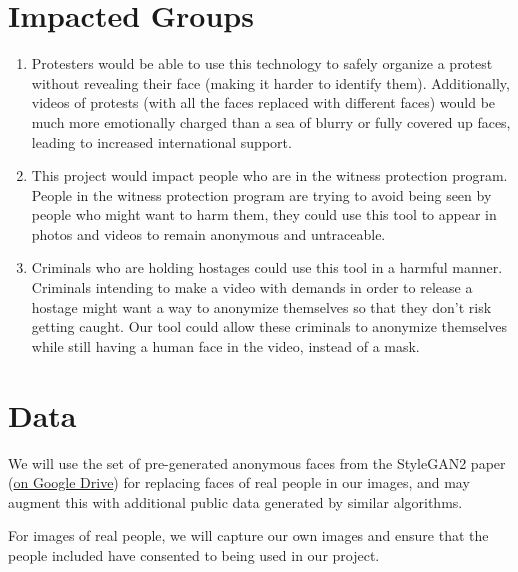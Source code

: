 \section*{Impacted Groups}


\begin{enumerate}
    \item Protesters would be able to use this technology to safely organize a protest without revealing their face (making it harder to identify them). Additionally, videos of protests (with all the faces replaced with different faces) would be much more emotionally charged than a sea of blurry or fully covered up faces, leading to increased international support.

    \item This project would impact people who are in the witness protection program. People in the witness protection program are trying to avoid being seen by people who might want to harm them, they could use this tool to appear in photos and videos to remain anonymous and untraceable.

    \item Criminals who are holding hostages could use this tool in a harmful manner. Criminals intending to make a video with demands in order to release a hostage might want a way to anonymize themselves so that they don't risk getting caught. Our tool could allow these criminals to anonymize themselves while still having a human face in the video, instead of a mask.

\end{enumerate}

\section*{Data}


We will use the set of pre-generated anonymous faces from the StyleGAN2 paper (\href{https://drive.google.com/drive/folders/1-0YhtXe_oE2ei0R471X33a_NJyY5dVge}{on Google Drive}) for replacing faces of real people in our images, and may augment this with additional public data generated by similar algorithms.

For images of real people, we will capture our own images and ensure that the people included have consented to being used in our project.

